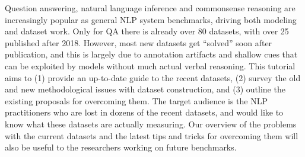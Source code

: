 Question answering, natural language inference and commonsense reasoning are increasingly popular as general NLP system benchmarks, driving both modeling and dataset work. Only for QA there is already over 80 datasets, with over 25 published after 2018. However, most new datasets get ``solved'' soon after publication, and this is largely due to annotation artifacts and shallow cues that can be exploited by models without much actual verbal reasoning. This tutorial aims to (1) provide an up-to-date guide to the recent datasets, (2) survey the old and new methodological issues with dataset construction, and (3) outline the existing proposals for overcoming them. The target audience is the NLP practitioners who are lost in dozens of the recent datasets, and would like to know what these datasets are actually measuring. Our overview of the problems with the current datasets and the latest tips and tricks for overcoming them will also be useful to the researchers working on future benchmarks.
